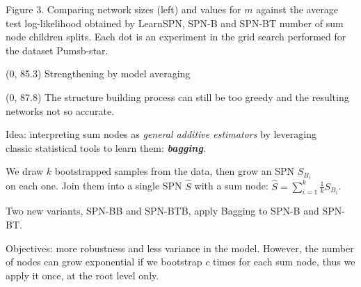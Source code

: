 \documentclass[final]{beamer}
\begin{document}
\begin{frame}{}
\begin{textblock}{25.2}
    \vspace{-20pt}
    \begin{center}
      \begin{minipage}[t]{0.9\linewidth}
        \tiny\flushleft
        Figure 3. Comparing network sizes (left) and values for $m$
        against the  average test
        log-likelihood obtained by \textsf{LearnSPN}, \textsf{SPN-B} and
        \textsf{SPN-BT}
        number of sum node children splits. Each dot is an experiment
        in the grid search performed for the dataset Pumsb-star.
      \end{minipage}
    \end{center}

  \end{textblock}
  
  
  
  \begin{textblock}{80}(0, 85.3)
    Strengthening by model averaging
  \end{textblock}
  
  \begin{textblock}{25.2}(0, 87.8)
    \footnotesize
    The structure building process can still be too greedy and the
    resulting networks not so accurate.\par\bigskip
    
    Idea: interpreting sum nodes as \emph{general additive estimators}
    by leveraging\\
    classic statistical tools to learn them:
    \textbf{\emph{bagging}}.\par\bigskip

    We draw $k$ bootstrapped samples from the data, then grow an SPN
    $S_{B_i}$\\
    on each one. Join them into a single SPN $\hat{S}$ with a sum node:
    $\hat{S}=\sum_{i=1}^{k}\frac{1}{k}S_{B_{i}}$.\par\bigskip
    
    Two new variants, \textsf{SPN-BB} and
    \textsf{SPN-BTB}, apply \textsf{B}agging to \textsf{SPN-B} and \textsf{SPN-BT}.\par\bigskip

    Objectives: more robustness and less variance in the model.
    However, the number of nodes can grow exponential if we bootstrap
    $c$ times for each sum node, thus we
    apply it once, at the root level only.


\end{textblock}
\end{frame}
\end{document}
